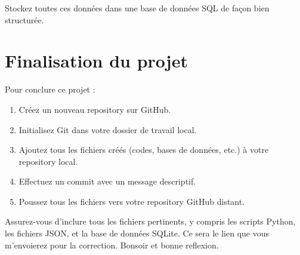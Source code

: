 \documentclass[20pt]{article}
\begin{document}
Stockez toutes ces données dans une base de données SQL de façon bien structurée.




\section{Finalisation du projet}

Pour conclure ce projet :

\begin{enumerate}
    \item Créez un nouveau repository sur GitHub.
    \item Initialisez Git dans votre dossier de travail local.
    \item Ajoutez tous les fichiers créés (codes, bases de données, etc.) à votre repository local.
    \item Effectuez un commit avec un message descriptif.
    \item Poussez tous les fichiers vers votre repository GitHub distant.
\end{enumerate}

Assurez-vous d'inclure tous les fichiers pertinents, y compris les scripts Python, les fichiers JSON, et la base de données SQLite.
Ce sera le lien que vous m'envoierez pour la correction. 
Bonsoir et bonne reflexion.
\end{document}
